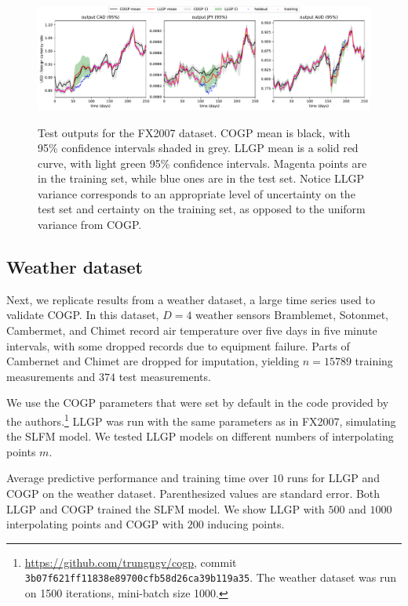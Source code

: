 \documentclass{article}
\begin{document}
\begin{figure}[!h]
\centering
{\includegraphics[width=\textwidth]{fx2007graph.pdf}}
\caption{Test outputs for the FX2007 dataset. COGP mean is black, with 95\% confidence intervals shaded in grey. LLGP mean is a solid red curve, with light green 95\% confidence intervals. Magenta points are in the training set, while blue ones are in the test set. Notice LLGP variance corresponds to an appropriate level of uncertainty on the test set and certainty on the training set, as opposed to the uniform variance from COGP.}
\label{fx2007-graph}
\end{figure}

\subsection{Weather dataset}\label{large-bench}

Next, we replicate results from a weather dataset, a large time series used to validate COGP. In this dataset, $D=4$ weather sensors Bramblemet, Sotonmet, Cambermet, and Chimet record air temperature over five days in five minute intervals, with some dropped records due to equipment failure. Parts of Cambernet and Chimet are dropped for imputation, yielding $n=15789$ training measurements and $374$ test measurements. 

We use the COGP parameters that were set by default in the code provided by the authors.\footnote{\url{https://github.com/trungngv/cogp}, commit \texttt{3b07f621ff11838e89700cfb58d26ca39b119a35}. The weather dataset was run on 1500 iterations, mini-batch size 1000.} LLGP was run with the same parameters as in FX2007, simulating the SLFM model. We tested LLGP models on different numbers of interpolating points $m$.

\begin{table}[!h]
  \caption{Average predictive performance and training time over $10$ runs for LLGP and COGP on the weather dataset. Parenthesized values are standard error. Both LLGP and COGP trained the SLFM model. We show LLGP with $500$ and $1000$ interpolating points and COGP with $200$ inducing points.}
\label{weather-tbl}
\begin{center}
  \begin{small}
    \begin{sc}
      
\end{sc}
\end{small}
\end{center}
\end{table}
\end{document}
